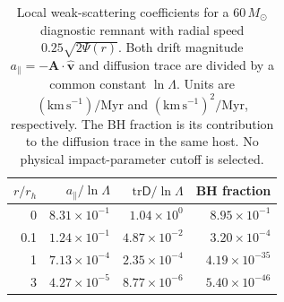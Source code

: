 \begin{table}[t]
\caption{Local weak-scattering coefficients for a $60\,M_\odot$ diagnostic remnant with radial speed $0.25\sqrt{2\Psi(r)}$. Both drift magnitude $a_\parallel=-\mathbf A\cdot\widehat{\mathbf v}$ and diffusion trace are divided by a common constant $\ln\Lambda$. Units are $(\mathrm{km\,s^{-1}})/\mathrm{Myr}$ and $(\mathrm{km\,s^{-1}})^2/\mathrm{Myr}$, respectively. The BH fraction is its contribution to the diffusion trace in the same host. No physical impact-parameter cutoff is selected.}\label{tab:local-kernels}
\centering\begin{tabular}{rrrr}
\toprule $r/r_h$ & $a_\parallel/\ln\Lambda$ & $\mathrm{tr}\mathsf D/\ln\Lambda$ & BH fraction \\
\midrule
0 & $8.31\times10^{-1}$ & $1.04\times10^{0}$ & $8.95\times10^{-1}$ \\
0.1 & $1.24\times10^{-1}$ & $4.87\times10^{-2}$ & $3.20\times10^{-4}$ \\
1 & $7.13\times10^{-4}$ & $2.35\times10^{-4}$ & $4.19\times10^{-35}$ \\
3 & $4.27\times10^{-5}$ & $8.77\times10^{-6}$ & $5.40\times10^{-46}$ \\
\bottomrule
\end{tabular}
\end{table}
